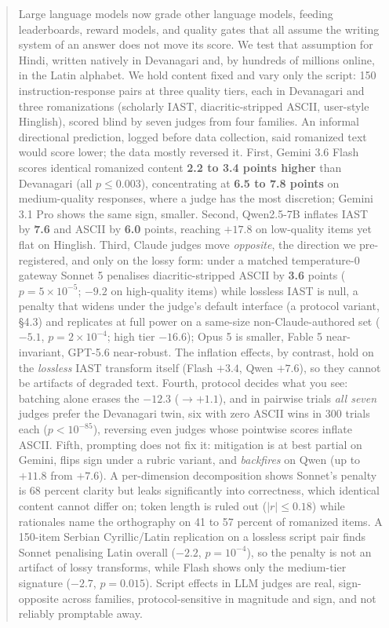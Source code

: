\begin{abstract}
Large language models now grade other language models, feeding leaderboards, reward models, and quality gates that all assume the writing system of an answer does not move its score. We test that assumption for Hindi, written natively in Devanagari and, by hundreds of millions online, in the Latin alphabet. We hold content fixed and vary only the script: 150 instruction-response pairs at three quality tiers, each in Devanagari and three romanizations (scholarly IAST, diacritic-stripped ASCII, user-style Hinglish), scored blind by seven judges from four families. An informal directional prediction, logged before data collection, said romanized text would score lower; the data mostly reversed it. First, Gemini 3.6 Flash scores identical romanized content \textbf{2.2 to 3.4 points higher} than Devanagari (all $p \le 0.003$), concentrating at \textbf{6.5 to 7.8 points} on medium-quality responses, where a judge has the most discretion; Gemini 3.1 Pro shows the same sign, smaller. Second, Qwen2.5-7B inflates IAST by \textbf{7.6} and ASCII by \textbf{6.0} points, reaching $\mathbf{+17.8}$ on low-quality items yet flat on Hinglish. Third, Claude judges move \emph{opposite}, the direction we pre-registered, and only on the lossy form: under a matched temperature-0 gateway Sonnet 5 penalises diacritic-stripped ASCII by \textbf{3.6} points ($p = 5\times10^{-5}$; $-9.2$ on high-quality items) while lossless IAST is null, a penalty that widens under the judge's default interface (a protocol variant, \S4.3) and replicates at full power on a same-size non-Claude-authored set ($-5.1$, $p = 2 \times 10^{-4}$; high tier $-16.6$); Opus 5 is smaller, Fable 5 near-invariant, GPT-5.6 near-robust. The inflation effects, by contrast, hold on the \emph{lossless} IAST transform itself (Flash $+3.4$, Qwen $+7.6$), so they cannot be artifacts of degraded text. Fourth, protocol decides what you see: batching alone erases the $-12.3$ ($\to +1.1$), and in pairwise trials \emph{all seven} judges prefer the Devanagari twin, six with zero ASCII wins in 300 trials each ($p<10^{-85}$), reversing even judges whose pointwise scores inflate ASCII. Fifth, prompting does not fix it: mitigation is at best partial on Gemini, flips sign under a rubric variant, and \emph{backfires} on Qwen (up to $+11.8$ from $+7.6$). A per-dimension decomposition shows Sonnet's penalty is 68 percent clarity but leaks significantly into correctness, which identical content cannot differ on; token length is ruled out ($|r|\le0.18$) while rationales name the orthography on 41 to 57 percent of romanized items. A 150-item Serbian Cyrillic/Latin replication on a lossless script pair finds Sonnet penalising Latin overall ($-2.2$, $p = 10^{-4}$), so the penalty is not an artifact of lossy transforms, while Flash shows only the medium-tier signature ($-2.7$, $p = 0.015$). Script effects in LLM judges are real, sign-opposite across families, protocol-sensitive in magnitude and sign, and not reliably promptable away.
\end{abstract}

